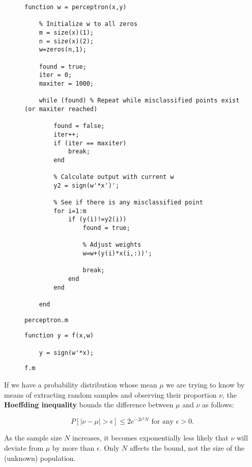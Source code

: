 \documentclass[11pt]{article}
\begin{document}
\begin{figure}[H]
\captionsetup{justification=raggedright,
singlelinecheck=false
}
\caption{\texttt{perceptron.m}}
\begin{lstlisting}
function w = perceptron(x,y)

    % Initialize w to all zeros
    m = size(x)(1);
    n = size(x)(2);
    w=zeros(n,1);

    found = true;
    iter = 0;
    maxiter = 1000;

    while (found) % Repeat while misclassified points exist (or maxiter reached)
        
        found = false;
        iter++;
        if (iter == maxiter)
            break;
        end

        % Calculate output with current w
        y2 = sign(w'*x')';

        % See if there is any misclassified point
        for i=1:m
            if (y(i)!=y2(i))
                found = true;

                % Adjust weights
                w=w+(y(i)*x(i,:))';

                break;
            end
        end

    end
\end{lstlisting}
\label{perceptron.m}
\end{figure}

\begin{figure}[H]
\captionsetup{justification=raggedright,
singlelinecheck=false
}
\caption{\texttt{f.m}}
\begin{lstlisting}
function y = f(x,w)
  
    y = sign(w'*x);
\end{lstlisting}
\label{f.m}
\end{figure}

If we have a probability distribution whose mean $\mu$ we are trying to know by means of extracting random samples and observing their proportion $\nu$, the \textbf{Hoeffding inequality} bounds the difference between $\mu$ and $\nu$ as follows:

\begin{equation}
P[|\nu-\mu|>\epsilon]\leq 2e^{-2\epsilon^2N}\text{ for any $\epsilon > 0$}.
\label{hoeffding1}
\end{equation} 

As the sample size $N$ increases, it becomes exponentially less likely that $\nu$ will deviate from $\mu$ by more than $\epsilon$. Only $N$ affects the bound, not the size of the (unknown) population.
\end{document}
